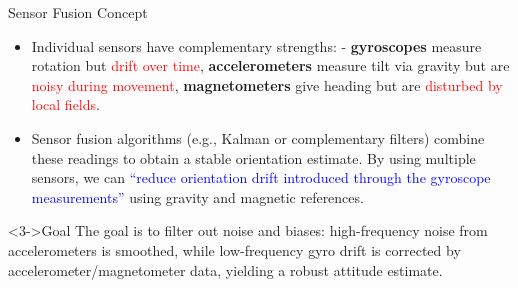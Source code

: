 \documentclass[aspectratio=169,xcolor=dvipsnames]{beamer}
\begin{document}
\begin{frame}{Sensor Fusion Concept}
\begin{itemize}[<+->]
  \item Individual sensors have complementary strengths: 
    - \textbf{gyroscopes} measure rotation but \textcolor{red}{drift over time}, \textbf{accelerometers} measure tilt via gravity but are \textcolor{red}{noisy during movement}, \textbf{magnetometers} give heading but are \textcolor{red}{disturbed by local fields}.
  \item Sensor fusion algorithms (e.g., Kalman\cite{EKF}\cite{doubleEKF}\cite{quatEKF} or complementary filters\cite{compfilter}) combine these readings to obtain a stable orientation estimate. By using multiple sensors, we can \textcolor{blue}{“reduce orientation drift introduced through the gyroscope measurements”} using gravity and magnetic references.
\end{itemize}
\begin{block}<3->{Goal}
    The goal is to filter out noise and biases: high-frequency noise from accelerometers is smoothed, while low-frequency gyro drift is corrected by accelerometer/magnetometer data, yielding a robust attitude estimate.
\end{block}
\end{frame}

\end{document}
